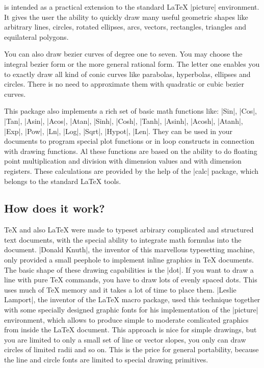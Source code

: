 \documentclass[a4paper,11pt]{article}
\begin{document}
\Lapdf{} is intended as a practical extension to the standard \LaTeX{}
|picture| environment. It gives the user the ability to quickly
draw many useful geometric shapes like arbitrary lines, circles,
rotated ellipses, arcs, vectors, rectangles, triangles and equilateral
polygons.

You can also draw bezier curves of degree one to seven. You may
choose the integral bezier form or the more general rational form.
The letter one enables you to exactly draw all kind of conic curves
like parabolas, hyperbolas, ellipses and circles. There is no need to
approximate them with quadratic or cubic bezier curves.

This package also implements a rich set of basic math functions like: |Sin|,
|Cos|, |Tan|, |Asin|, |Acos|, |Atan|, |Sinh|, |Cosh|, |Tanh|, |Asinh|, |Acosh|,
|Atanh|, |Exp|, |Pow|, |Ln|, |Log|, |Sqrt|, |Hypot|, |Len|. They can be used in
your documents to program special plot functions or in loop constructs in
connection with drawing functions. Al these functions are based on the ability
to do floating point multiplication and division with dimension values and
with dimension registers. These calculations are provided by the help of the
|calc| package, which belongs to the standard \LaTeX{} tools.

\subsection{How does it work?}

\TeX{} and also \LaTeX{} were made to typeset arbirary complicated and
structured text documents, with the special ability to integrate math formulas
into the document. |Donald Knuth|, the inventor of this marvellous
typesetting machine, only provided a small peephole to implement
inline graphics in \TeX{} documents. The basic shape of these drawing
capabilities is the |dot|. If you want to draw a line with pure \TeX{}
commands, you have to draw lots of evenly spaced dots. This uses much of
\TeX{} memory and it takes a lot of time to place them. |Leslie Lamport|,
the inventor of the \LaTeX{} macro package, used this technique together with
some specially designed graphic fonts for his implementation of the |picture|
environment, which allows to produce simple to moderate comlicated graphics
from inside the \LaTeX{} document. This approach is nice for simple
drawings, but you are limited to only a small set of line or vector slopes,
you only can draw circles of limited radii and so on. This is the price for
general portability, because the line and circle fonts are limited to special
drawing primitives.
\end{document}
